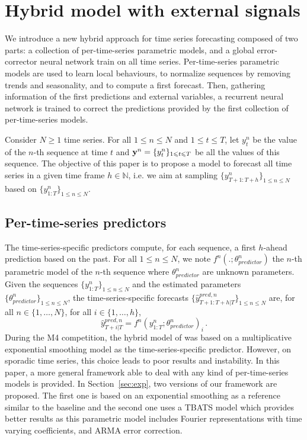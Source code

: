 \documentclass[review]{elsarticle}
\newcommand{\ts}{y}
\newcommand{\fullts}{{\bf \ts}}
\newcommand{\tspred}{\widehat{\ts}}
\newcommand{\stat}{f}
\newcommand{\statparam}{\theta_{predictor}}
\newcommand{\lag}{h}
\begin{document}
\section{Hybrid model with external signals}
\label{sec:hybrid}
We introduce a new hybrid approach for time series forecasting  composed of two parts: a collection of per-time-series parametric models, and a global error-corrector neural network train on all time series. Per-time-series parametric models are used to learn local behaviours, to normalize sequences by removing trends and seasonality,  and to compute a first forecast. Then, gathering information of the first predictions and external variables, a recurrent neural network is trained to correct the predictions provided by the first collection of per-time-series models.

Consider $N\geqslant 1$ time series. For all $1\leqslant n \leqslant N$ and $1\leqslant t \leqslant T$, let $\ts_t^n$ be the value of the $n$-th sequence at time $t$ and  $\fullts^n = \{\ts_t^n\}_{1\leqslant t \leqslant T}$ be all the values of this sequence. The objective of this paper is to propose a model to  forecast all time series in a given time frame  $\lag \in \mathbb{N}$, i.e. we aim at sampling $\{\ts^n_{T+1:T+\lag}\}_{1\leqslant n \leqslant N}$ based on $\{\ts^n_{1:T}\}_{1\leqslant n \leqslant N}$.


\subsection{Per-time-series predictors}
The time-series-specific predictors compute, for each sequence, a first $\lag$-ahead prediction based on the past. For all $1\leqslant n \leqslant N$, we note $\stat^n(.;\statparam^n)$ the $n$-th parametric model of the $n$-th sequence where $\statparam^n$ are  unknown parameters. Given the sequences $\{\ts^n_{1:T}\}_{1\leqslant n \leqslant N}$ and the estimated  parameters $\{\statparam^n\}_{1\leqslant n \leqslant N}$, the time-series-specific forecasts $\{\tspred^{pred,n}_{T+1:T+\lag|T}\}_{1\leqslant n \leqslant N}$ are, for all $n \in \{1,\ldots,N\}$, for all $i \in \{1,\ldots,\lag\}$,
\begin{equation}
    \label{eq:predictors}
    \tspred^{pred,n}_{T+i|T} = \stat^n(\ts^n_{1:T};\statparam^n)_i\,.
\end{equation}
During the M4 competition, the hybrid model of \cite{smyl2020} was based on a multiplicative exponential smoothing model as the time-series-specific predictor. However, on sporadic time series, this choice leads to poor results and instability. In this paper, a more general framework able to deal with any kind of per-time-series models is provided. In Section~\ref{sec:exp}, two versions of our framework are proposed. The first one is based on an  exponential smoothing as a reference similar to the baseline \cite{smyl2020} and the second one uses a TBATS model \cite{alysha2011} which provides better results as this parametric model includes  Fourier representations with time varying coefficients, and ARMA error correction. 
\end{document}
